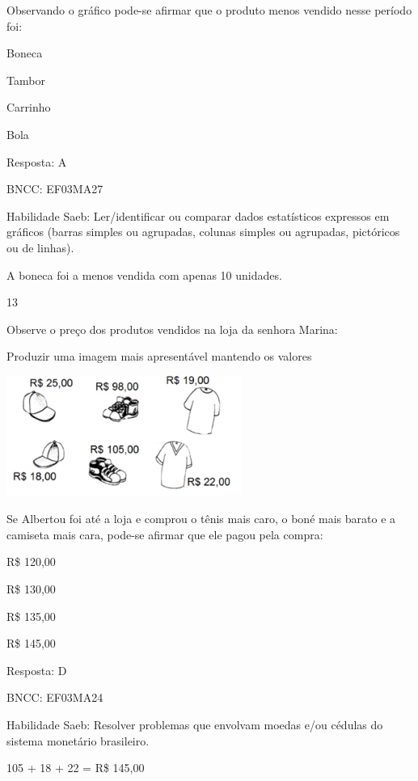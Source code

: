 \begin{escolha}
\begin{escolha}
Observando o gráfico pode-se afirmar que o produto menos vendido nesse
período foi:

\begin{escolha}

\item
  Boneca
\item
  Tambor
\item
  Carrinho
\item
  Bola
\end{escolha}

Resposta: A

BNCC: EF03MA27

Habilidade Saeb: Ler/identificar ou comparar dados estatísticos
expressos em gráficos (barras simples ou agrupadas, colunas simples ou
agrupadas, pictóricos ou de linhas).

A boneca foi a menos vendida com apenas 10 unidades.

\num{13}

Observe o preço dos produtos vendidos na loja da senhora Marina:

Produzir uma imagem mais apresentável mantendo os valores

\includegraphics[width=3.02451in,height=1.54853in]{media/image138.png}

Se Albertou foi até a loja e comprou o tênis mais caro, o boné mais
barato e a camiseta mais cara, pode-se afirmar que ele pagou pela
compra:

\begin{escolha}

\item
  R\$ 120,00
\item
  R\$ 130,00
\item
  R\$ 135,00
\item
  R\$ 145,00
\end{escolha}

Resposta: D

BNCC: EF03MA24

Habilidade Saeb: Resolver problemas que envolvam moedas e/ou cédulas do
sistema monetário brasileiro.

105 + 18 + 22 = R\$ 145,00


\end{escolha}
\end{escolha}
